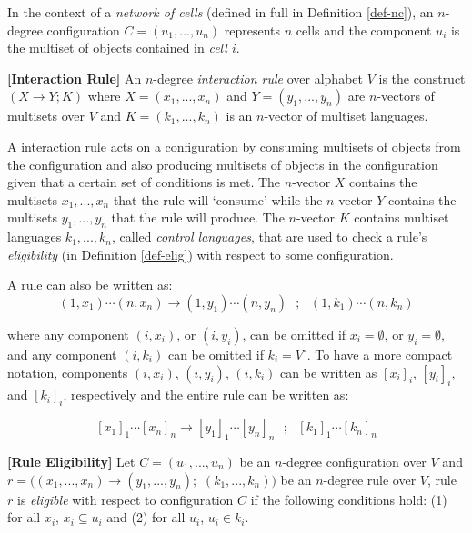 \documentclass[a4paper]{article}
\theoremstyle{definition}
\newcommand{\ra}{\rightarrow}
\newcommand{\ts}{\text{ }}
\begin{document}
In the context of a \emph{network of cells} (defined in full in Definition \ref{def-nc}), an
$n$-degree configuration $C = (u_1,...,u_n)$ represents $n$ cells and the component $u_i$ is the
multiset of objects contained in \emph{cell $i$}.


\label{def-rule} \textbf{[Interaction Rule]} An $n$-degree \emph{interaction rule} over
alphabet $V$ is the construct $(X \ra Y; K)$ where $X=(x_1,...,x_n)$ and $Y=(y_1,...,y_n)$ 
are $n$-vectors of multisets over $V$ and $K = (k_1,...,k_n)$ is an $n$-vector of multiset
languages.

A interaction rule acts on a configuration by consuming multisets of objects from the configuration
and also producing multisets of objects in the configuration given that a certain set of conditions
is met. The $n$-vector $X$ contains the multisets $x_1,...,x_n$ that the rule will `consume' while
the $n$-vector $Y$ contains the multisets $y_1,...,y_n$ that the rule will produce. The $n$-vector 
$K$ contains multiset languages $k_1,...,k_n$, called \emph{control languages}, that are used to 
check a rule's \emph{eligibility} (in Definition \ref{def-elig}) with respect to some configuration.

A rule can also be written as:
$$(1,x_1)\cdots(n,x_n)\ra (1,y_1)\cdots(n,y_n)\ts;\ts (1,k_1)\cdots(n,k_n)$$

where any component $(i,x_i)$, or $(i,y_i)$, can be omitted if $x_i = \emptyset$, or 
$y_i = \emptyset$, and any component $(i,k_i)$ can be omitted if $k_i = V^{\circ}$. To have a more
compact notation, components $(i,x_i)$, $(i,y_i)$, $(i,k_i)$ can be written as ${[x_i]}_i$,
${[y_i]}_i$, and ${[k_i]}_i$, respectively and the entire rule can be written as:

$${[x_1]}_1\cdots {[x_n]}_n \ra {[y_1]}_1\cdots{[y_n]}_n\ts ;\ts {[k_1]}_1\cdots{[k_n]}_n$$


\label{def-elig} \textbf{[Rule Eligibility]} Let $C = (u_1,...,u_n)$ be an $n$-degree
configuration over $V$ and $r = ((x_1,...,x_n) \ra (y_1,...,y_n);$ $(k_1,...,k_n))$ be an $n$-degree
rule over $V$, rule $r$ is \emph{eligible} with respect to configuration $C$ if the following 
conditions hold: (1) for all $x_i$, $x_i \subseteq u_i$ and (2) for all $u_i$, $u_i \in k_i$.
\end{document}
